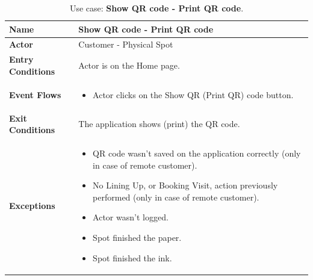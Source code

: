 \begin{table}[H]
    \centering
    \begin{tabular}{| m{} | m{} |}
        \hline
        \textbf{Name}            & Show QR code - Print QR code               \\
        \hline
        \textbf{Actor}            & Customer - Physical Spot                   \\
        \hline
        \textbf{Entry Conditions} & Actor is on the Home page.                 \\
        \hline
        \textbf{Event Flows} &
        \begin{itemize}
            \item Actor clicks on the Show QR (Print QR) code button.
        \end{itemize} \\
        \hline
        \textbf{Exit Conditions}  & The application shows (print) the QR code. \\
        \hline
        \textbf{Exceptions} &
        \begin{itemize}
            \item QR code wasn't saved on the application correctly (only in case of remote customer).
            \item No Lining Up, or Booking Visit, action previously performed (only in case of remote customer).
            \item Actor wasn't logged.
            \item Spot finished the paper.
            \item Spot finished the ink.
        \end{itemize} \\
        \hline
    \end{tabular}
    \caption{Use case: \textbf{Show QR code - Print QR code}.}
    \label{tableShowQR}
\end{table}

